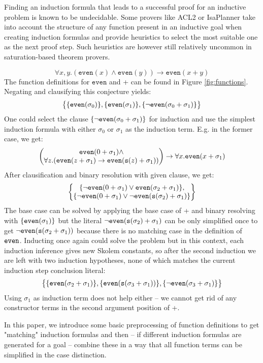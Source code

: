 Finding an induction formula that leads to a successful proof for an inductive problem is known to be undecidable. Some provers like ACL2 or IsaPlanner take into account the structure of any function present in an inductive goal when creating induction formulas and provide heuristics to select the most suitable one as the next proof step. Such heuristics are however still relatively uncommon in saturation-based theorem provers.
\begin{example}\label{ex:1}
$$\forall x,y. (\mathtt{even}(x)\land \mathtt{even}(y))\rightarrow \mathtt{even}(x+y)$$
The function definitions for $\mathtt{even}$ and + can be found in Figure \ref{fig:functions}. Negating and clausifying this conjecture yields:
$$\begin{Bmatrix}
\{\mathtt{even}(\sigma_0)\},\{\mathtt{even}(\sigma_1)\},\{\neg\mathtt{even}(\sigma_0+\sigma_1)\}
\end{Bmatrix}$$
One could select the clause $\{\neg\mathtt{even}(\sigma_0+\sigma_1)\}$ for induction and use the simplest induction formula with either $\sigma_0$ or $\sigma_1$ as the induction term. E.g. in the former case, we get:
$$\begin{pmatrix}\mathtt{even}(0+\sigma_1)\land\\
\forall z.(\mathtt{even}(z+\sigma_1)\rightarrow\mathtt{even}(\mathtt{s}(z)+\sigma_1))\end{pmatrix}\rightarrow \forall x.\mathtt{even}(x+\sigma_1)$$
After clausification and binary resolution with given clause, we get:
$$\begin{Bmatrix}
\{\neg\mathtt{even}(0+\sigma_1)\lor \mathtt{even}(\sigma_2+\sigma_1)\},\\
\{\neg\mathtt{even}(0+\sigma_1)\lor \neg\mathtt{even}(\mathtt{s}(\sigma_2)+\sigma_1)\}
\end{Bmatrix}$$
The base case can be solved by applying the base case of + and binary resolving with $\{\mathtt{even}(\sigma_1)\}$ but the literal $\neg\mathtt{even}(\mathtt{s}(\sigma_2)+\sigma_1)$ can be only simplified once to get $\neg\mathtt{even}(\mathtt{s}(\sigma_2+\sigma_1))$ because there is no matching case in the definition of $\mathtt{even}$. Inducting once again could solve the problem but in this context, each induction inference gives new Skolem constants, so after the second induction we are left with two induction hypotheses, none of which matches the current induction step conclusion literal:
$$\begin{Bmatrix}
\{\mathtt{even}(\sigma_2+\sigma_1)\},\{\mathtt{even}(\mathtt{s}(\sigma_3+\sigma_1))\},\{\neg\mathtt{even}(\sigma_3+\sigma_1)\}
\end{Bmatrix}$$
Using $\sigma_1$ as induction term does not help either -- we cannot get rid of any constructor terms in the second argument position of +.
\end{example}
In this paper, we introduce some basic preprocessing of function definitions to get "matching" induction formulas and then -- if different induction formulas are generated for a goal -- combine these in a way that all function terms can be simplified in the case distinction.

